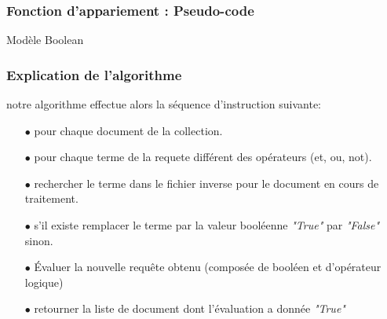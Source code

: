 \documentclass[12pt,a4paper,oneside]{article}
\begin{document}
\subsubsection*{Fonction d'appariement : Pseudo-code} 

\begin{algorithm}[H]
	\DontPrintSemicolon
	
	
	
	\;
	\caption{{\sc Modèle Boolean}}
	\label{algo:duplicate2}
\end{algorithm}



\subsubsection*{Explication de l'algorithme}
notre algorithme effectue alors la séquence d'instruction suivante:
\begin{itemize}
	\item[$\bullet$] pour chaque document de la collection.
	\item[$\bullet$] pour chaque terme de la requete différent des opérateurs (et, ou, not).
	\item[$\bullet$] rechercher le terme dans le fichier inverse pour le document en cours de traitement.
	\item[$\bullet$] s'il existe remplacer le terme par la valeur booléenne \textit{"True"} par \textit{"False"} sinon.
	\item[$\bullet$] Évaluer la nouvelle requête obtenu (composée de booléen et d'opérateur logique)
	\item[$\bullet$] retourner la liste de document dont l'évaluation a donnée \textit{"True"}
\end{itemize}
\end{document}
